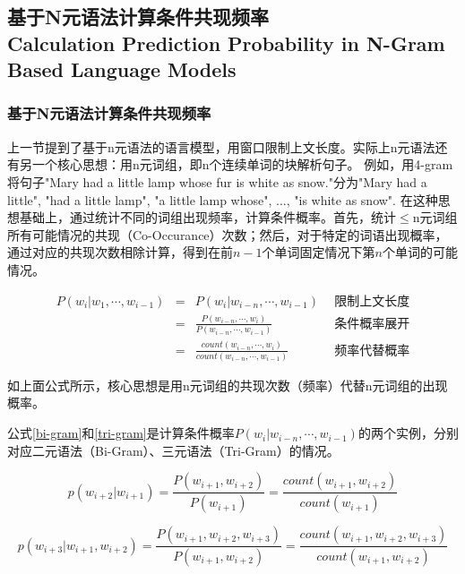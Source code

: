 \subsection{基于N元语法计算条件共现频率 \\ Calculation Prediction Probability in N-Gram Based Language Models}
\label{n-gram}

\subsubsection{基于N元语法计算条件共现频率}

上一节提到了基于n元语法的语言模型，用窗口限制上文长度。实际上n元语法还有另一个核心思想：用n元词组，即n个连续单词的块解析句子。
例如，用4-gram将句子"Mary had a little lamp whose fur is white as snow."分为"Mary had a little", "had a little lamp", "a little lamp whose", ..., "is white as snow".
在这种思想基础上，通过统计不同的词组出现频率，计算条件概率。首先，统计$\leq$n元词组所有可能情况的共现（Co-Occurance）次数；然后，对于特定的词语出现概率，通过对应的共现次数相除计算，得到在前$n-1$个单词固定情况下第$n$个单词的可能情况。

\begin{equation*}
\begin{aligned}
P(w_i | w_1, \cdots, w_{i-1}) & = & P(w_i | w_{i-n}, \cdots, w_{i-1}) & \ \ \mbox{限制上文长度}\\
 & = & \frac{P(w_{i-n}, \cdots, w_{i})}{P(w_{i-n}, \cdots, w_{i-1})} & \ \ \mbox{条件概率展开}\\
 & = & \frac{count(w_{i-n}, \cdots, w_{i})}{count(w_{i-n}, \cdots, w_{i-1})} & \ \ \mbox{频率代替概率}
\end{aligned}
\end{equation*}

如上面公式所示，核心思想是用n元词组的共现次数（频率）代替n元词组的出现概率。

公式\ref{bi-gram}和\ref{tri-gram}是计算条件概率$P(w_i | w_{i-n}, \cdots, w_{i-1})$的两个实例，分别对应二元语法（Bi-Gram）、三元语法（Tri-Gram）的情况。

\begin{equation}
\label{bi-gram}
p(w_{i + 2} | w_{i + 1}) = \frac{P(w_{i + 1}, w_{i + 2})}{P(w_{i + 1})} = \frac{count(w_{i + 1}, w_{i + 2})}{count(w_{i + 1})}
\end{equation}

\begin{equation}
\label{tri-gram}
p(w_{i + 3} | w_{i + 1}, w_{i + 2}) = \frac{P(w_{i + 1}, w_{i + 2}, w_{i + 3})}{P(w_{i + 1}, w_{i + 2})} = \frac{count(w_{i + 1}, w_{i + 2}, w_{i + 3})}{count(w_{i + 1}, w_{i + 2})}
\end{equation}

